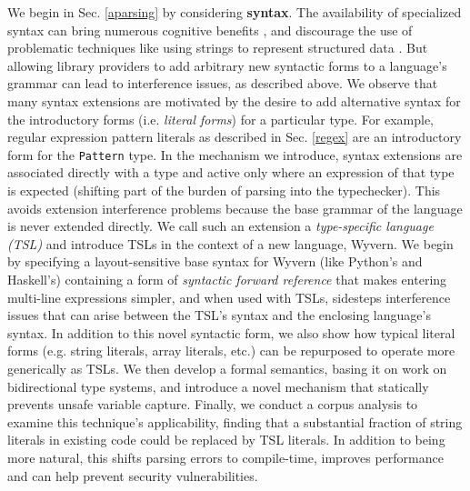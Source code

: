 We begin in Sec. \ref{aparsing} by considering \textbf{syntax}. The availability of specialized syntax can bring numerous cognitive benefits \cite{green1996usability}, and discourage the use of problematic techniques like using strings to represent structured data \cite{Bravenboer:2007:PIA:1289971.1289975}. But allowing library providers to add arbitrary new syntactic forms to a language's grammar can lead to interference issues, as described above. We observe that many syntax extensions are motivated by the desire to add alternative syntax for the introductory forms (i.e. \emph{literal forms}) for a particular type. For example, regular expression pattern literals as described in Sec. \ref{regex} are an introductory form for the \verb|Pattern| type.  In the mechanism we introduce, syntax extensions are associated directly with a type and active only where an expression of that type is expected (shifting part of the burden of parsing into the typechecker). This avoids extension interference problems because the base grammar of the language is never extended directly. We call such an extension a \emph{type-specific language (TSL)} and introduce TSLs in the context of a new language, Wyvern. We begin by specifying a layout-sensitive base syntax for Wyvern (like Python's and Haskell's) containing a form of \emph{syntactic forward reference} that makes entering multi-line expressions simpler, and when used with TSLs, sidesteps interference issues that can arise between the TSL's syntax and the enclosing language's syntax. In addition to this novel syntactic form, we also show how typical literal forms (e.g. string literals, array literals, etc.) can be repurposed to operate more generically as TSLs. We then develop a formal semantics, basing it on work on bidirectional type systems, and introduce a novel mechanism that statically prevents unsafe variable capture. Finally, we conduct a corpus analysis to examine this technique's applicability, finding that a substantial fraction of string literals in existing code could be replaced by TSL literals. In addition to being more natural, this shifts parsing errors to compile-time, improves performance and can help prevent security vulnerabilities.

